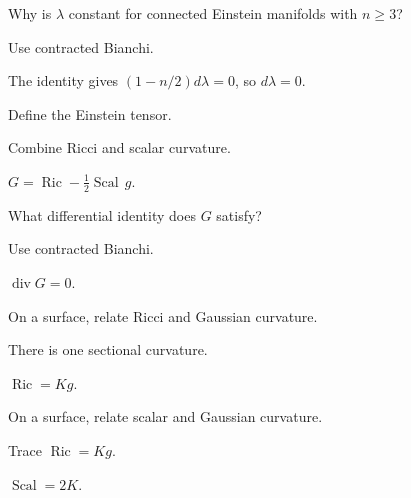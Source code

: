 \begin{exercise}\label{exr:vii27-18}
Why is \(\lambda\) constant for connected Einstein manifolds with \(n\ge3\)?
\end{exercise}
\begin{hint}
Use contracted Bianchi.
\end{hint}
\begin{solution}
The identity gives \((1-n/2)d\lambda=0\), so \(d\lambda=0\).
\end{solution}

\begin{exercise}\label{exr:vii27-19}
Define the Einstein tensor.
\end{exercise}
\begin{hint}
Combine Ricci and scalar curvature.
\end{hint}
\begin{solution}
\(G=\operatorname{Ric}-\frac12\operatorname{Scal}\,g\).
\end{solution}

\begin{exercise}\label{exr:vii27-20}
What differential identity does \(G\) satisfy?
\end{exercise}
\begin{hint}
Use contracted Bianchi.
\end{hint}
\begin{solution}
\(\operatorname{div}G=0\).
\end{solution}

\begin{exercise}\label{exr:vii27-21}
On a surface, relate Ricci and Gaussian curvature.
\end{exercise}
\begin{hint}
There is one sectional curvature.
\end{hint}
\begin{solution}
\(\operatorname{Ric}=K g\).
\end{solution}

\begin{exercise}\label{exr:vii27-22}
On a surface, relate scalar and Gaussian curvature.
\end{exercise}
\begin{hint}
Trace \(\operatorname{Ric}=Kg\).
\end{hint}
\begin{solution}
\(\operatorname{Scal}=2K\).
\end{solution}


